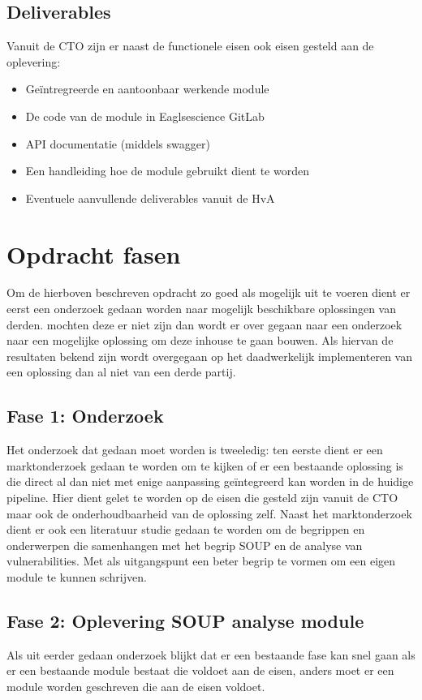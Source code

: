 \subsection{Deliverables}
Vanuit de CTO zijn er naast de functionele eisen ook eisen gesteld aan de oplevering:
\begin{itemize}
\item Geïntregreerde en aantoonbaar werkende module
\item De code van de module in Eaglsescience GitLab
\item API documentatie (middels swagger)
\item Een handleiding hoe de module gebruikt dient te worden
\item Eventuele aanvullende deliverables vanuit de HvA
\end{itemize}


\section{Opdracht fasen}

Om de hierboven beschreven opdracht zo goed als mogelijk uit te voeren dient er eerst een onderzoek gedaan worden naar mogelijk beschikbare oplossingen van derden.
mochten deze er niet zijn dan wordt er over gegaan naar een onderzoek naar een mogelijke oplossing om deze inhouse te gaan bouwen. Als hiervan de resultaten bekend zijn wordt overgegaan op het daadwerkelijk implementeren van een oplossing dan al niet van een derde partij. 

\subsection{Fase 1: Onderzoek}
Het onderzoek dat gedaan moet worden is tweeledig: ten eerste dient er een marktonderzoek gedaan te worden om te kijken of er een bestaande oplossing is die direct al dan niet met enige aanpassing ge\"integreerd kan worden in de huidige pipeline. Hier dient gelet te worden op de eisen die gesteld zijn vanuit de CTO maar ook de onderhoudbaarheid van de oplossing zelf.
Naast het marktonderzoek dient er ook een literatuur studie gedaan te worden om de begrippen en onderwerpen die samenhangen met het begrip SOUP en de analyse van vulnerabilities. Met als uitgangspunt een beter begrip te vormen om een eigen module te kunnen schrijven. 


\subsection{Fase 2: Oplevering SOUP analyse module}
Als uit eerder gedaan onderzoek blijkt dat er een bestaande 
 fase kan snel gaan als er een bestaande module bestaat die voldoet aan de eisen, anders moet er een module worden geschreven die aan de eisen voldoet. 

